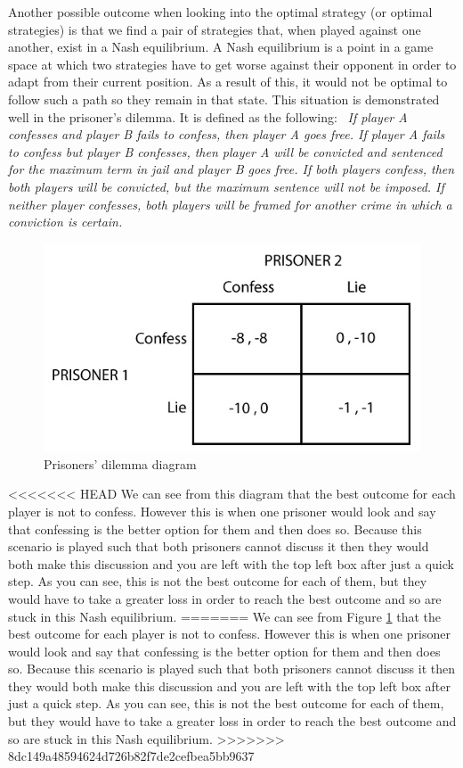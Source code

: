 \documentclass[a4paper,titlepage]{article}
\begin{document}
Another possible outcome when looking into the optimal strategy (or optimal strategies) is that we find a pair of strategies that, when played against one another, exist in a Nash equilibrium. A Nash equilibrium\cite{nash} is a point in a game space at which two strategies have to get worse against their opponent in order to adapt from their current position. As a result of this, it would not be optimal to follow such a path so they remain in that state. This situation is demonstrated well in the prisoner's dilemma. It is defined as the following: \ \textit{If player A confesses and player B fails to confess, then player A goes free. If player A fails to confess but player B confesses, then player A will be convicted and sentenced for the maximum term in jail and player B goes free. If both players confess, then both players will be convicted, but the maximum sentence will not be imposed. If neither player confesses, both players will be framed for another crime in which a conviction is certain.}
\\
\begin{figure}
\centering
\includegraphics[scale=0.8]{prisoners_dilemma}
\caption{Prisoners' dilemma diagram\label{figure3}}
\end{figure}
<<<<<<< HEAD
We can see from this diagram that the best outcome for each player is not to confess. However this is when one prisoner would look and say that confessing is the better option for them and then does so. Because this scenario is played such that both prisoners cannot discuss it then they would both make this discussion and you are left with the top left box after just a quick step. As you can see, this is not the best outcome for each of them, but they would have to take a greater loss in order to reach the best outcome and so are stuck in this Nash equilibrium.
\newpage
=======
We can see from Figure \ref{figure3} that the best outcome for each player is not to confess. However this is when one prisoner would look and say that confessing is the better option for them and then does so. Because this scenario is played such that both prisoners cannot discuss it then they would both make this discussion and you are left with the top left box after just a quick step. As you can see, this is not the best outcome for each of them, but they would have to take a greater loss in order to reach the best outcome and so are stuck in this Nash equilibrium.
>>>>>>> 8dc149a48594624d726b82f7de2cefbea5bb9637
\end{document}
